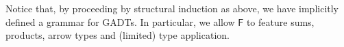 \documentclass[acmsmall,screen,review,anonymous]{acmart}
\theoremstyle{definition}
\begin{document}
Notice that, by proceeding by structural induction as above,
we have implicitly defined a grammar for GADTs.
In particular, we allow $\mathsf{F}$ to feature sums, products, arrow types and (limited) type application.

%
%
%
%
\end{document}
